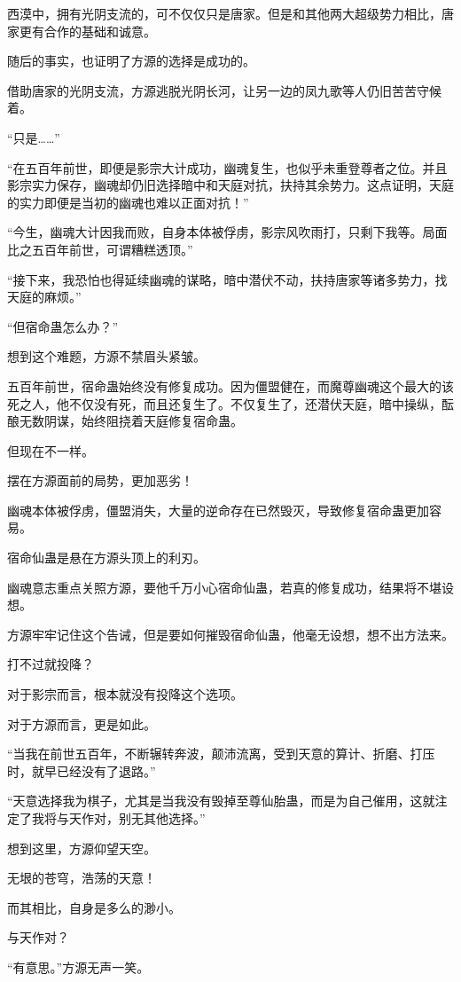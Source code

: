 \begin{this_body}
西漠中，拥有光阴支流的，可不仅仅只是唐家。但是和其他两大超级势力相比，唐家更有合作的基础和诚意。

随后的事实，也证明了方源的选择是成功的。

借助唐家的光阴支流，方源逃脱光阴长河，让另一边的凤九歌等人仍旧苦苦守候着。

“只是……”

“在五百年前世，即便是影宗大计成功，幽魂复生，也似乎未重登尊者之位。并且影宗实力保存，幽魂却仍旧选择暗中和天庭对抗，扶持其余势力。这点证明，天庭的实力即便是当初的幽魂也难以正面对抗！”

“今生，幽魂大计因我而败，自身本体被俘虏，影宗风吹雨打，只剩下我等。局面比之五百年前世，可谓糟糕透顶。”

“接下来，我恐怕也得延续幽魂的谋略，暗中潜伏不动，扶持唐家等诸多势力，找天庭的麻烦。”

“但宿命蛊怎么办？”

想到这个难题，方源不禁眉头紧皱。

五百年前世，宿命蛊始终没有修复成功。因为僵盟健在，而魔尊幽魂这个最大的该死之人，他不仅没有死，而且还复生了。不仅复生了，还潜伏天庭，暗中操纵，酝酿无数阴谋，始终阻挠着天庭修复宿命蛊。

但现在不一样。

摆在方源面前的局势，更加恶劣！

幽魂本体被俘虏，僵盟消失，大量的逆命存在已然毁灭，导致修复宿命蛊更加容易。

宿命仙蛊是悬在方源头顶上的利刃。

幽魂意志重点关照方源，要他千万小心宿命仙蛊，若真的修复成功，结果将不堪设想。

方源牢牢记住这个告诫，但是要如何摧毁宿命仙蛊，他毫无设想，想不出方法来。

打不过就投降？

对于影宗而言，根本就没有投降这个选项。

对于方源而言，更是如此。

“当我在前世五百年，不断辗转奔波，颠沛流离，受到天意的算计、折磨、打压时，就早已经没有了退路。”

“天意选择我为棋子，尤其是当我没有毁掉至尊仙胎蛊，而是为自己催用，这就注定了我将与天作对，别无其他选择。”

想到这里，方源仰望天空。

无垠的苍穹，浩荡的天意！

而其相比，自身是多么的渺小。

与天作对？

“有意思。”方源无声一笑。

\end{this_body}

